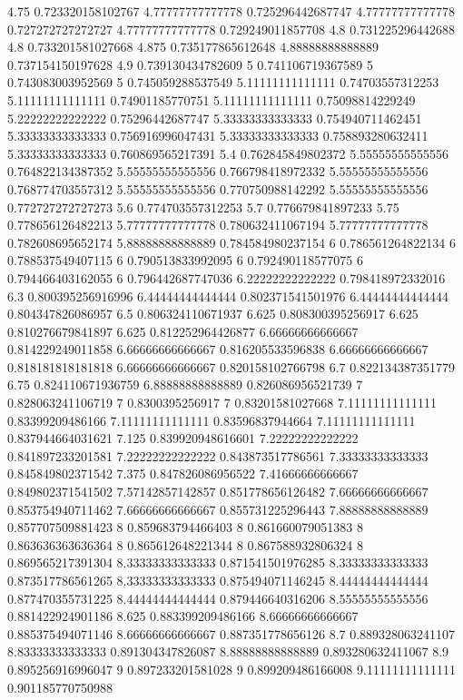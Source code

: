 {4.75 0.723320158102767
4.77777777777778 0.725296442687747
4.77777777777778 0.727272727272727
4.77777777777778 0.729249011857708
4.8 0.731225296442688
4.8 0.733201581027668
4.875 0.735177865612648
4.88888888888889 0.737154150197628
4.9 0.739130434782609
5 0.741106719367589
5 0.743083003952569
5 0.745059288537549
5.11111111111111 0.74703557312253
5.11111111111111 0.74901185770751
5.11111111111111 0.75098814229249
5.22222222222222 0.75296442687747
5.33333333333333 0.754940711462451
5.33333333333333 0.756916996047431
5.33333333333333 0.758893280632411
5.33333333333333 0.760869565217391
5.4 0.762845849802372
5.55555555555556 0.764822134387352
5.55555555555556 0.766798418972332
5.55555555555556 0.768774703557312
5.55555555555556 0.770750988142292
5.55555555555556 0.772727272727273
5.6 0.774703557312253
5.7 0.776679841897233
5.75 0.778656126482213
5.77777777777778 0.780632411067194
5.77777777777778 0.782608695652174
5.88888888888889 0.784584980237154
6 0.786561264822134
6 0.788537549407115
6 0.790513833992095
6 0.792490118577075
6 0.794466403162055
6 0.796442687747036
6.22222222222222 0.798418972332016
6.3 0.800395256916996
6.44444444444444 0.802371541501976
6.44444444444444 0.804347826086957
6.5 0.806324110671937
6.625 0.808300395256917
6.625 0.810276679841897
6.625 0.812252964426877
6.66666666666667 0.814229249011858
6.66666666666667 0.816205533596838
6.66666666666667 0.818181818181818
6.66666666666667 0.820158102766798
6.7 0.822134387351779
6.75 0.824110671936759
6.88888888888889 0.826086956521739
7 0.828063241106719
7 0.8300395256917
7 0.83201581027668
7.11111111111111 0.83399209486166
7.11111111111111 0.83596837944664
7.11111111111111 0.837944664031621
7.125 0.839920948616601
7.22222222222222 0.841897233201581
7.22222222222222 0.843873517786561
7.33333333333333 0.845849802371542
7.375 0.847826086956522
7.41666666666667 0.849802371541502
7.57142857142857 0.851778656126482
7.66666666666667 0.853754940711462
7.66666666666667 0.855731225296443
7.88888888888889 0.857707509881423
8 0.859683794466403
8 0.861660079051383
8 0.863636363636364
8 0.865612648221344
8 0.867588932806324
8 0.869565217391304
8.33333333333333 0.871541501976285
8.33333333333333 0.873517786561265
8.33333333333333 0.875494071146245
8.44444444444444 0.877470355731225
8.44444444444444 0.879446640316206
8.55555555555556 0.881422924901186
8.625 0.883399209486166
8.66666666666667 0.885375494071146
8.66666666666667 0.887351778656126
8.7 0.889328063241107
8.83333333333333 0.891304347826087
8.88888888888889 0.893280632411067
8.9 0.895256916996047
9 0.897233201581028
9 0.899209486166008
9.11111111111111 0.901185770750988
}
